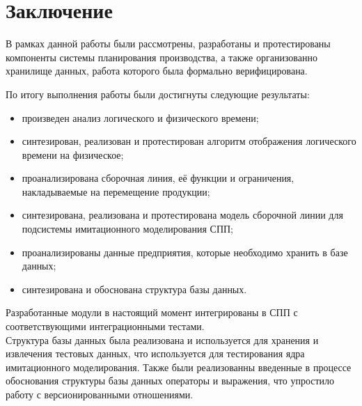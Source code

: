 \section*{Заключение}
В рамках данной работы были рассмотрены, разработаны и протестированы компоненты системы планирования производства, а также организованно хранилище данных, работа которого была формально верифицирована.

По итогу выполнения работы были достигнуты следующие результаты:
\begin{itemize}
	\item произведен анализ логического и физического времени;
	\item синтезирован, реализован и протестирован алгоритм отображения логического времени на физическое;
	\item проанализирована сборочная линия, её функции и ограничения, накладываемые на перемещение продукции;
	\item синтезирована, реализована и протестирована модель сборочной линии для подсистемы имитационного моделирования СПП;
	\item проанализированы данные предприятия, которые необходимо хранить в базе данных;
	\item синтезирована и обоснована структура базы данных.
\end{itemize}

\indent Разработанные модули в настоящий момент интегрированы в СПП с соответствующими интеграционными тестами.\\
\indent Структура базы данных была реализована и используется для хранения и извлечения тестовых данных, что используется для тестирования ядра имитационного моделирования. 
Также были реализованны введенные в процессе обоснования структуры базы данных операторы и выражения, что упростило работу с версионированными отношениями.


